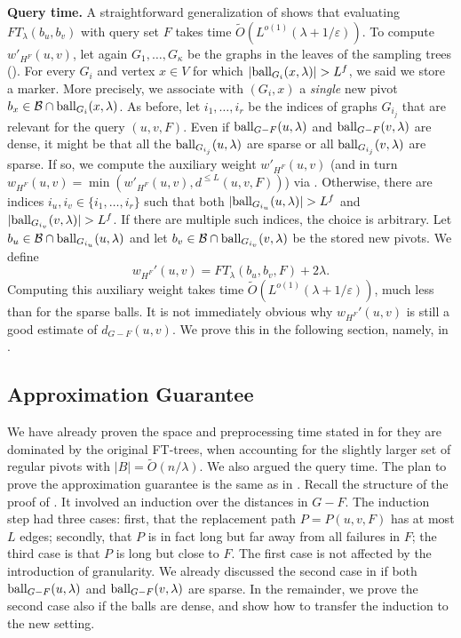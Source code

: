 \documentclass{article}\usepackage[a4paper,margin=20mm]{geometry}
\newcommand*{\Otilde}{\widetilde{O}}
\newcommand*{\ball}{\mbox{\rm ball}}
\renewcommand{\le}{\leqslant}
\begin{document}
\noindent
\textbf{Query time.}
A straightforward generalization of 
shows that evaluating $FT_{\lambda}(b_u,b_v)$ with query set $F$
takes time $\Otilde(L^{o(1)} (\lambda + 1/\varepsilon))$.
To compute $w'_{H^F}(u,v)$,
let again $G_1, \ldots, G_\kappa$ be the graphs in the leaves of the sampling trees ().
For every $G_i$ and vertex $x \in V$ for which $|\ball_{G_i}(x,\lambda)| > L^f$,
we said we store a marker.
More precisely, we associate with $(G_i,x)$
a \emph{single} new pivot $b_x \in \mathcal{B} \cap \ball_{G_i}(x,\lambda)$. 
As before, let $i_1, \dots, i_r$ be the indices of graphs $G_{i_j}$
that are relevant for the query $(u,v,F)$.
Even if $\ball_{G-F}(u,\lambda)$ and $\ball_{G-F}(v,\lambda)$
are dense, it might be that all the $\ball_{G_{i_j}}(u,\lambda)$ are sparse
or all $\ball_{G_{i_j}}(v,\lambda)$ are sparse.
If so, we compute the auxiliary weight $w'_{H^F}(u,v)$
(and in turn $w_{H^F}(u,v) = \min(w'_{H^F}(u,v), d^{\le L}(u,v,F))$) 
via .
%
Otherwise, there are indices $i_u,i_v \in \{i_1, \ldots, i_r\}$ such that both
$|\ball_{G_{i_u}}(u,\lambda)| > L^f$ and $|\ball_{G_{i_v}}(v,\lambda)| > L^f$.
If there are multiple such indices, the choice is arbitrary.
Let $b_u \in \mathcal{B} \cap \ball_{G_{i_u}}(u, \lambda)$ and let $b_v \in \mathcal{B} \cap \ball_{G_{i_v}}(v, \lambda)$ be the stored new pivots.
We define
\begin{equation} 
\label{eq:dense-pivots}
w_{H^F}'(u,v)= FT_\lambda(b_u, b_v, F) + 2\lambda.
\end{equation}
Computing this auxiliary weight takes time $\Otilde(L^{o(1)} (\lambda + 1/\varepsilon))$,
much less than for the sparse balls.
It is not immediately obvious why $w_{H^F}'(u,v)$ is still a good estimate of $d_{G-F}(u,v)$.
We prove this in the following section, namely, in .


\subsection{Approximation Guarantee}
\label{subsec:improved_wrapup}

We have already proven the space and preprocessing time stated in 
for they are dominated by the original FT-trees,
when accounting for the slightly larger set of regular pivots with $|B| = \Otilde(n/\lambda)$.
We also argued the query time.
%
The plan to prove the approximation guarantee is the same as in .
Recall the structure of the proof of .
It involved an induction over the distances in $G{-}F$.
The induction step had three cases:
first, that the replacement path $P =P(u,v,F)$ has at most $L$ edges;
secondly, that $P$ is in fact long but far away from all failures in $F$;
the third case is that $P$ is long but close to $F$.
The first case is not affected by the introduction of granularity.
We already discussed the second case in 
if both $\ball_{G-F}(u,\lambda)$ and $\ball_{G-F}(v,\lambda)$ are sparse.
In the remainder, we prove the second case also if the balls are dense,
and show how to transfer the induction to the new setting.
\end{document}
